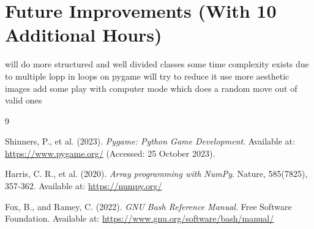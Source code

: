 \documentclass{report}
\begin{document}
\section{Future Improvements (With 10 Additional Hours)}
will do more structured and well divided classes
some time complexity exists due to multiple lopp in loops on pygame will try to reduce it
use more aesthetic images
add some play with computer mode which does a random move out of valid ones

\clearpage

\begin{thebibliography}{9}

Shinners, P., et al. (2023). \textit{Pygame: Python Game Development}. Available at: \url{https://www.pygame.org/} (Accessed: 25 October 2023).

Harris, C. R., et al. (2020). \textit{Array programming with NumPy}. Nature, 585(7825), 357-362. Available at: \url{https://numpy.org/}

Fox, B., and Ramey, C. (2022). \textit{GNU Bash Reference Manual}. Free Software Foundation. Available at: \url{https://www.gnu.org/software/bash/manual/}

\end{thebibliography}
\printbibliography
\end{document}
